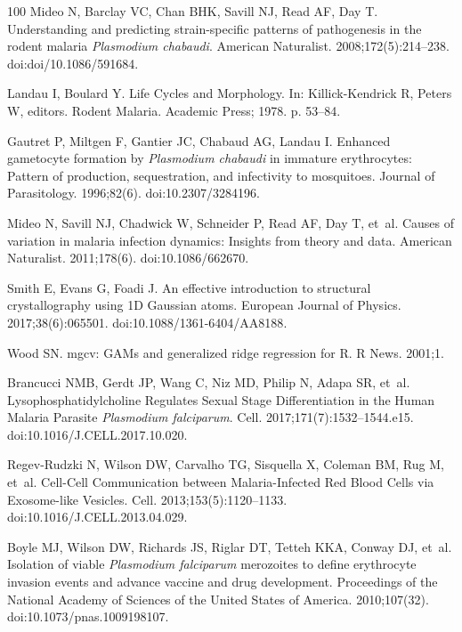 \documentclass[10pt,letterpaper]{article}
\begin{document}
\begin{thebibliography}{100}
Mideo N, Barclay VC, Chan BHK, Savill NJ, Read AF, Day T.
\newblock Understanding and predicting strain-specific patterns of pathogenesis in the rodent malaria \textit{{Plasmodium} chabaudi}.
\newblock American Naturalist. 2008;172(5):214--238.
\newblock doi:{doi/10.1086/591684}.

Landau I, Boulard Y.
\newblock Life {Cycles} and {Morphology}.
\newblock In: Killick-Kendrick R, Peters W, editors. Rodent {Malaria}. Academic Press; 1978. p. 53--84.

Gautret P, Miltgen F, Gantier JC, Chabaud AG, Landau I.
\newblock Enhanced gametocyte formation by \textit{{Plasmodium} chabaudi} in immature erythrocytes: {Pattern} of production, sequestration, and infectivity to mosquitoes.
\newblock Journal of Parasitology. 1996;82(6).
\newblock doi:{10.2307/3284196}.

Mideo N, Savill NJ, Chadwick W, Schneider P, Read AF, Day T, et~al.
\newblock Causes of variation in malaria infection dynamics: {Insights} from theory and data.
\newblock American Naturalist. 2011;178(6).
\newblock doi:{10.1086/662670}.

Smith E, Evans G, Foadi J.
\newblock An effective introduction to structural crystallography using {1D} {Gaussian} atoms.
\newblock European Journal of Physics. 2017;38(6):065501.
\newblock doi:{10.1088/1361-6404/AA8188}.

Wood SN.
\newblock mgcv: {GAMs} and generalized ridge regression for {R}.
\newblock R News. 2001;1.

Brancucci NMB, Gerdt JP, Wang C, Niz MD, Philip N, Adapa SR, et~al.
\newblock Lysophosphatidylcholine {Regulates} {Sexual} {Stage} {Differentiation} in the {Human} {Malaria} {Parasite} \textit{{Plasmodium} falciparum}.
\newblock Cell. 2017;171(7):1532--1544.e15.
\newblock doi:{10.1016/J.CELL.2017.10.020}.

Regev-Rudzki N, Wilson DW, Carvalho TG, Sisquella X, Coleman BM, Rug M, et~al.
\newblock Cell-{Cell} {Communication} between {Malaria}-{Infected} {Red} {Blood} {Cells} via {Exosome}-like {Vesicles}.
\newblock Cell. 2013;153(5):1120--1133.
\newblock doi:{10.1016/J.CELL.2013.04.029}.

Boyle MJ, Wilson DW, Richards JS, Riglar DT, Tetteh KKA, Conway DJ, et~al.
\newblock Isolation of viable \textit{{Plasmodium} falciparum} merozoites to define erythrocyte invasion events and advance vaccine and drug development.
\newblock Proceedings of the National Academy of Sciences of the United States of America. 2010;107(32).
\newblock doi:{10.1073/pnas.1009198107}.


\end{thebibliography}
\end{document}

